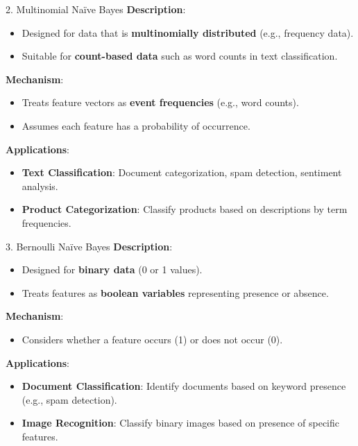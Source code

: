\begin{frame}{2. Multinomial Naïve Bayes}
	\textbf{Description}:
	\begin{itemize}
		\item Designed for data that is \textbf{multinomially distributed} (e.g., frequency data).
		\item Suitable for \textbf{count-based data} such as word counts in text classification.
	\end{itemize}
	
	\textbf{Mechanism}:
	\begin{itemize}
		\item Treats feature vectors as \textbf{event frequencies} (e.g., word counts).
		\item Assumes each feature has a probability of occurrence.
	\end{itemize}
	
	\textbf{Applications}:
	\begin{itemize}
		\item \textbf{Text Classification}: Document categorization, spam detection, sentiment analysis.
		\item \textbf{Product Categorization}: Classify products based on descriptions by term frequencies.
	\end{itemize}
\end{frame}


\begin{frame}{3. Bernoulli Naïve Bayes}
	\textbf{Description}:
	\begin{itemize}
		\item Designed for \textbf{binary data} (0 or 1 values).
		\item Treats features as \textbf{boolean variables} representing presence or absence.
	\end{itemize}
	
	\textbf{Mechanism}:
	\begin{itemize}
		\item Considers whether a feature occurs (1) or does not occur (0).
	\end{itemize}
	
	\textbf{Applications}:
	\begin{itemize}
		\item \textbf{Document Classification}: Identify documents based on keyword presence (e.g., spam detection).
		\item \textbf{Image Recognition}: Classify binary images based on presence of specific features.
	\end{itemize}
\end{frame}







